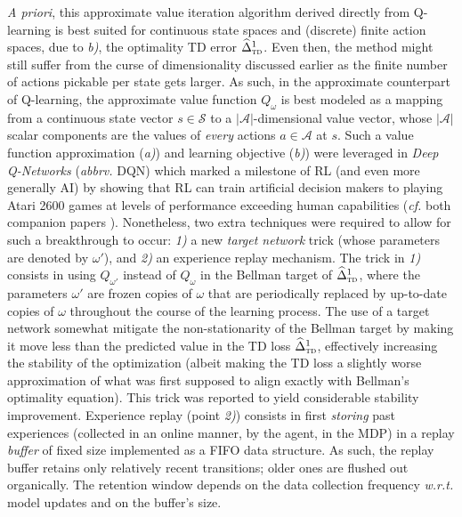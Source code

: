 \textit{A priori}, this approximate value iteration algorithm derived directly from Q-learning
is best suited for continuous state spaces and (discrete) finite action spaces,
due to \textit{b)}, the optimality TD error $\widehat{\Delta}_\textsc{td}^1$.
Even then, the method might still suffer from the curse of dimensionality discussed earlier
as the finite number of actions pickable per state gets larger.
As such, in the approximate counterpart of Q-learning, the approximate value function $Q_\omega$ is best modeled
as a mapping from a continuous state vector $s \in \mathcal{S}$
to a $|\mathcal{A}|$-dimensional value vector, whose $|\mathcal{A}|$ scalar components are the
values of \emph{every} actions $a \in \mathcal{A}$ at $s$.
Such a value function approximation (\textit{a)})
and learning objective (\textit{b)})
were leveraged in \emph{Deep Q-Networks} (\textit{abbrv.} DQN)
which marked a milestone of RL (and even more generally AI)
by showing that RL can train artificial decision makers to playing Atari 2600 games
at levels of performance exceeding human capabilities
(\textit{cf.} both companion papers \cite{Mnih2013-rb,Mnih2015-iy}).
Nonetheless, two extra techniques were required to allow for such a breakthrough to occur:
\textit{1)} a new \textit{target network} trick (whose parameters are denoted by $\omega'$), and
\textit{2)} an experience replay mechanism.
The trick in \textit{1)} consists in using $Q_{\omega'}$ instead of $Q_\omega$ in the Bellman target of
$\widehat{\Delta}_\textsc{td}^1$, where the parameters $\omega'$ are frozen copies of $\omega$ that are
periodically replaced by up-to-date copies of $\omega$ throughout the course of the learning process.
The use of a target network somewhat mitigate the non-stationarity of the Bellman target by
making it move less than the predicted value in the TD loss $\widehat{\Delta}_\textsc{td}^1$,
effectively increasing the stability of the optimization (albeit making the TD loss a slightly worse approximation
of what was first supposed to align exactly with Bellman's optimality equation).
This trick was reported to yield considerable stability improvement.
Experience replay (point \textit{2)}) consists in first \emph{storing} past experiences
(collected in an online manner, by the agent, in the MDP)
in a replay \emph{buffer} of fixed size implemented as a FIFO data structure.
As such, the replay buffer retains only relatively recent transitions; older ones are flushed out organically.
The retention window depends on the data collection frequency \textit{w.r.t.} model updates and on the buffer's size.
